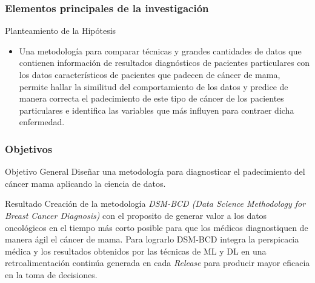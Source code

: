 \documentclass[xcolor=dvipsnames,xcolor=table]{beamer} %
\begin{document}
\begin{frame}
	\frametitle{Elementos principales de la investigación}
	\begin{block}{Planteamiento de la Hipótesis} \justifying
	\begin{itemize}
		\item Una metodología para comparar técnicas y grandes cantidades de datos que contienen información de resultados diagnósticos de pacientes particulares con los datos característicos de pacientes que padecen de cáncer de mama, permite hallar la similitud del comportamiento de los datos y predice de manera correcta el padecimiento de este tipo de cáncer de los pacientes particulares e identifica las variables que más influyen para contraer dicha enfermedad. 
	\end{itemize}

	\end{block}
\end{frame}
\begin{frame}
	\frametitle{Objetivos}
	\begin{block}{Objetivo General}
		\justifying		
		Diseñar una metodología para diagnosticar el padecimiento del cáncer mama aplicando la ciencia de datos. 
	\end{block}
	
	\begin{alertblock}{Resultado}
	\justifying	
	Creación de la metodología \textit{DSM-BCD (Data Science Methodology for Breast Cancer Diagnosis)} con el proposito de generar valor a los datos oncológicos en el tiempo más corto posible para que los médicos diagnostiquen de manera ágil el cáncer de mama. Para lograrlo DSM-BCD integra la perspicacia médica y los resultados obtenidos por las técnicas de ML y DL en una retroalimentación continúa generada en cada \textit{Release} para producir mayor eficacia en la toma de decisiones.
	\end{alertblock}

\end{frame}
\end{document}
